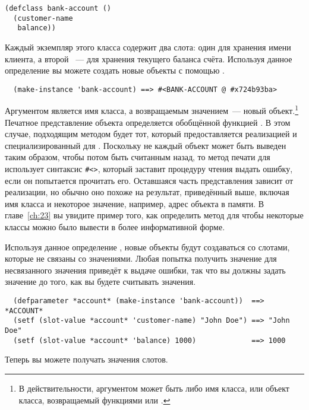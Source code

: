 \begin{lstlisting}
(defclass bank-account ()
  (customer-name
   balance))
\end{lstlisting}

Каждый экземпляр этого класса содержит два слота: один для хранения имени клиента, а
второй ~--- для хранения текущего баланса счёта.  Используя данное определение вы можете
создать новые объекты  с помощью .

\begin{verbatim}
  (make-instance 'bank-account) ==> #<BANK-ACCOUNT @ #x724b93ba>
\end{verbatim}

Аргументом  является имя класса, а возвращаемым значением~--- новый
объект.\footnote{В действительности, аргументом  может быть либо имя
  класса, или объект класса, возвращаемый функциями  или
  .}  Печатное представление объекта определяется обобщённой функцией
.  В этом случае, подходящим методом будет тот, который предоставляется
реализацией и специализированный для .  Поскольку не каждый объект
может быть выведен таким образом, чтобы потом быть считанным назад, то метод печати для
 использует синтаксис \lstinline!#<>!, который заставит процедуру
чтения выдать ошибку, если он попытается прочитать его.  Оставшаяся часть представления
зависит от реализации, но обычно оно похоже на результат, приведённый выше, включая имя
класса и некоторое значение, например, адрес объекта в памяти.  В главе~\ref{ch:23} вы
увидите пример того, как определить метод для  чтобы некоторые классы
можно было вывести в более информативной форме.

Используя данное определение , новые объекты будут создаваться со
слотами, которые не связаны со значениями.  Любая попытка получить значение для
несвязанного значения приведёт к выдаче ошибки, так что вы должны задать значение до того,
как вы будете считывать значения.

\begin{verbatim}
  (defparameter *account* (make-instance 'bank-account))  ==> *ACCOUNT*
  (setf (slot-value *account* 'customer-name) "John Doe") ==> "John Doe"
  (setf (slot-value *account* 'balance) 1000)             ==> 1000
\end{verbatim}

Теперь вы можете получать значения слотов.

